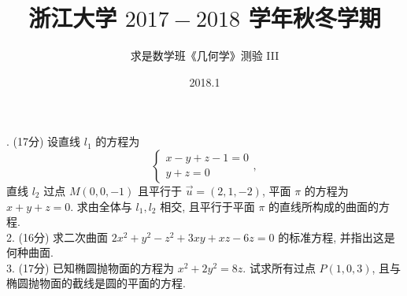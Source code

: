 \documentclass[UTF8]{ctexart}
\title{\textbf{浙江大学 $2017-2018$ 学年秋冬学期}}
\author{求是数学班《几何学》测验 III}
\date{2018.1}
\begin{document}
. (17分) 设直线 $l_1$ 的方程为
\[
\begin{cases}
x-y+z-1=0 \\
y+z=0
\end{cases},
\]
直线 $l_2$ 过点 $M(0,0,-1)$ 且平行于 $\overrightarrow{u}=(2,1,-2)$, 平面 $\pi$ 的方程为 $x+y+z=0$. 求由全体与 $l_1,l_2$ 相交, 且平行于平面 $\pi$ 的直线所构成的曲面的方程.
\\

2. (16分) 求二次曲面 $2x^2+y^2-z^2+3xy+xz-6z=0$ 的标准方程, 并指出这是何种曲面.
\\

3. (17分) 已知椭圆抛物面的方程为 $x^2+2y^2=8z$. 试求所有过点 $P(1,0,3)$, 且与椭圆抛物面的截线是圆的平面的方程.
\end{document}
